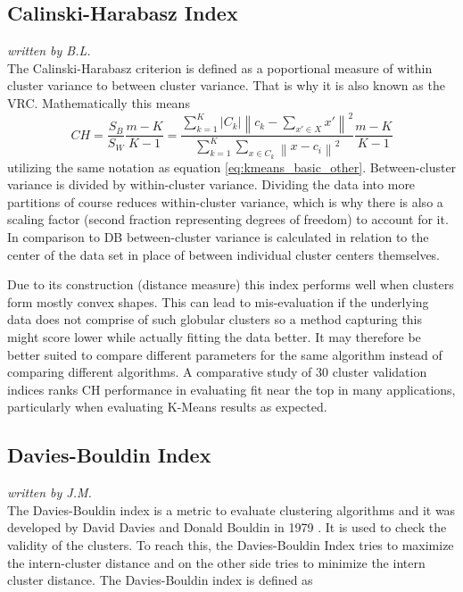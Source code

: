 \subsection{Calinski-Harabasz Index}
\textit{written by B.L.}\\

The Calinski-Harabasz criterion \cite{calinski1974dendrite} is defined as a poportional measure of within cluster variance to between cluster variance. That is why it is also known as the \gls{VRC}. Mathematically this means
\begin{equation}
        CH = \frac{S_{B}}{S_{W}}\frac{m-K}{K-1} = \frac{\sum_{k=1}^{K} \left | C_{k} \right | \left \| c_{k} - \sum_{x' \in X}^{} x' \right \|^{2}}{\sum_{k=1}^{K}\sum_{x \in C_{k}}^{} \left \| x - c_{i} \right \|^{2}} \frac{m-K}{K-1}
\end{equation}
utilizing the same notation as equation \ref{eq:kmeans_basic_other}. Between-cluster variance is divided by within-cluster variance. Dividing the data into more partitions of course reduces within-cluster variance, which is why there is also a scaling factor (second fraction representing degrees of freedom) to account for it. In comparison to \gls{DB} between-cluster variance is calculated in relation to the center of the data set in place of between individual cluster centers themselves. 

Due to its construction (distance measure) this index performs well when clusters form mostly convex shapes. This can lead to mis-evaluation if the underlying data does not comprise of such globular clusters so a method capturing this might score lower while actually fitting the data better. It may therefore be better suited to compare different parameters for the same algorithm instead of comparing different algorithms. A comparative study of 30 cluster validation indices \cite{arbelaitz2013extensive} ranks \gls{CH} performance in evaluating fit near the top in many applications, particularly when evaluating K-Means results as expected.
    
\subsection{Davies-Bouldin Index}
\textit{written by J.M.}\\

The Davies-Bouldin index is a metric to evaluate clustering algorithms and it was developed by David Davies and Donald Bouldin in 1979 \cite{davies1979cluster}. 
It is used to check the validity of the clusters. To reach this, the Davies-Bouldin Index tries to maximize the intern-cluster distance 
and on the other side tries to minimize the intern cluster distance. 
The Davies-Bouldin index is defined as 
	
